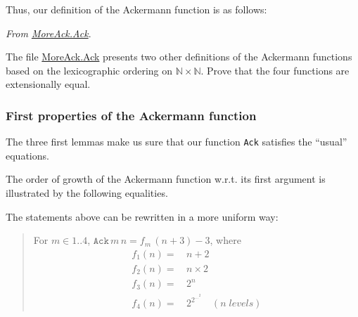 




Thus, our definition of the Ackermann function is as follows:

\vspace{4pt}
\noindent
\emph{From \href{../theories/html/hydras.MoreAck.Ack.html}{MoreAck.Ack}}.





\begin{exercise}
The file \href{../theories/html/hydras.MoreAck.Ack.html}{MoreAck.Ack} presents two other definitions of the Ackermann functions based on the lexicographic ordering on $\mathbb{N}\times\mathbb{N}$.
Prove that the four functions are extensionally equal.
\end{exercise}


\subsubsection{First properties of the Ackermann function}

The three first lemmas make us sure that our function 
\texttt{Ack} satisfies the ``usual'' equations.




\vspace{4pt}

The order of growth of the Ackermann function w.r.t. its first argument is illustrated by the following equalities.







\begin{remark}
 The statements above can be rewritten in a more uniform way:

 \begin{quote}
   For $m\in 1..4$, $\texttt{Ack}\,m\,n = f_m\,(n+3)-3$, where 
   \begin{align*}
   f_1(n)=&\,n+2 \\
   f_2(n)=&\,n\times 2\\
   f_3(n)=&\,2^n\\
   f_4(n)=&\,2^{2^{\dots^2}}\quad(n\;\textit{levels})
   \end{align*}
 \end{quote}
\end{remark}


